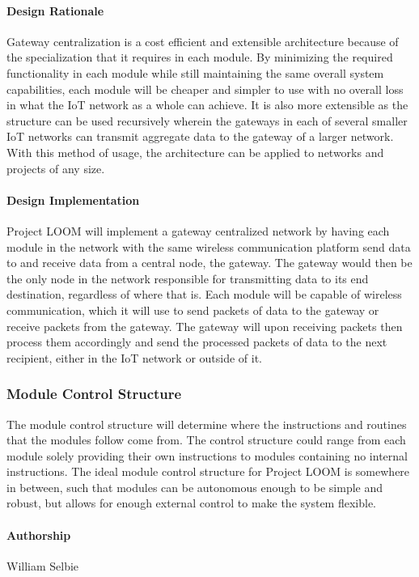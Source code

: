 \documentclass[onecolumn, draftclsnofoot,10pt, compsoc]{IEEEtran}
\begin{document}
\paragraph{Design Rationale}
    Gateway centralization is a cost efficient and extensible architecture because of the specialization that it requires in each module. By minimizing the required functionality in each module while still maintaining the same overall system capabilities, each module will be cheaper and simpler to use with no overall loss in what the IoT network as a whole can achieve. It is also more extensible as the structure can be used recursively wherein the gateways in each of several smaller IoT networks can transmit aggregate data to the gateway of a larger network. With this method of usage, the architecture can be applied to networks and projects of any size.

\paragraph{Design Implementation}
    Project LOOM will implement a gateway centralized network by having each module in the network with the same wireless communication platform send data to and receive data from a central node, the gateway. The gateway would then be the only node in the network responsible for transmitting data to its end destination, regardless of where that is. Each module will be capable of wireless communication, which it will use to send packets of data to the gateway or receive packets from the gateway. The gateway will upon receiving packets then process them accordingly and send the processed packets of data to the next recipient, either in the IoT network or outside of it. 

\subsubsection{Module Control Structure}
    The module control structure will determine where the instructions and routines that the modules follow come from. The control structure could range from each module solely providing their own instructions to modules containing no internal instructions. The ideal module control structure for Project LOOM is somewhere in between, such that modules can be autonomous enough to be simple and robust, but allows for enough external control to make the system flexible.

\paragraph{Authorship}
    William Selbie
\end{document}
